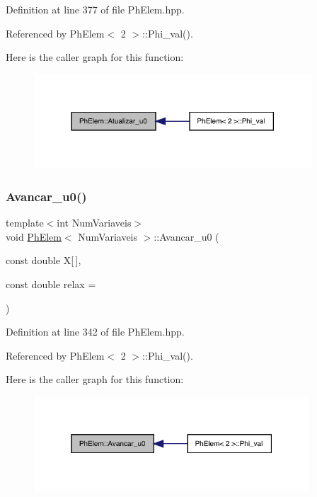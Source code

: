 Definition at line 377 of file Ph\+Elem.\+hpp.



Referenced by Ph\+Elem$<$ 2 $>$\+::\+Phi\+\_\+val().

Here is the caller graph for this function\+:
\nopagebreak
\begin{figure}[H]
\begin{center}
\leavevmode
\includegraphics[width=294pt]{classPhElem_aa3697427ea1b5024f52b98bcbcbb55f1_icgraph}
\end{center}
\end{figure}
\mbox{\label{classPhElem_a7dc16c86382b340e9d1c5983eb478cee}} 
\subsubsection{\texorpdfstring{Avancar\+\_\+u0()}{Avancar\_u0()}}
{\footnotesize\ttfamily template$<$int Num\+Variaveis$>$ \\
void \hyperlink{classPhElem}{Ph\+Elem}$<$ Num\+Variaveis $>$\+::Avancar\+\_\+u0 (\begin{DoxyParamCaption}\item[{const double}]{X\mbox{[}$\,$\mbox{]},  }\item[{const double}]{relax = {} }\end{DoxyParamCaption})}



Definition at line 342 of file Ph\+Elem.\+hpp.



Referenced by Ph\+Elem$<$ 2 $>$\+::\+Phi\+\_\+val().

Here is the caller graph for this function\+:
\nopagebreak
\begin{figure}[H]
\begin{center}
\leavevmode
\includegraphics[width=292pt]{classPhElem_a7dc16c86382b340e9d1c5983eb478cee_icgraph}
\end{center}
\end{figure}
\mbox{\label{classPhElem_a61311993fa273240a94044c599d52857}} 

